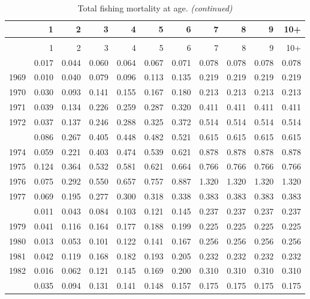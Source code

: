 \documentclass[
]{article}
\begin{document}
\begin{longtable}[t]{lrrrrrrrrrr}
\caption{\label{tab:FAA-tot-table}Total fishing mortality at age.}\\
\toprule
  & 1 & 2 & 3 & 4 & 5 & 6 & 7 & 8 & 9 & 10+\\
\midrule
\endfirsthead
\caption[]{Total fishing mortality at age. \textit{(continued)}}\\
\toprule
  & 1 & 2 & 3 & 4 & 5 & 6 & 7 & 8 & 9 & 10+\\
\midrule
\endhead

\endfoot
\bottomrule
\endlastfoot
1968 & 0.017 & 0.044 & 0.060 & 0.064 & 0.067 & 0.071 & 0.078 & 0.078 & 0.078 & 0.078\\
1969 & 0.010 & 0.040 & 0.079 & 0.096 & 0.113 & 0.135 & 0.219 & 0.219 & 0.219 & 0.219\\
1970 & 0.030 & 0.093 & 0.141 & 0.155 & 0.167 & 0.180 & 0.213 & 0.213 & 0.213 & 0.213\\
1971 & 0.039 & 0.134 & 0.226 & 0.259 & 0.287 & 0.320 & 0.411 & 0.411 & 0.411 & 0.411\\
1972 & 0.037 & 0.137 & 0.246 & 0.288 & 0.325 & 0.372 & 0.514 & 0.514 & 0.514 & 0.514\\
\addlinespace
1973 & 0.086 & 0.267 & 0.405 & 0.448 & 0.482 & 0.521 & 0.615 & 0.615 & 0.615 & 0.615\\
1974 & 0.059 & 0.221 & 0.403 & 0.474 & 0.539 & 0.621 & 0.878 & 0.878 & 0.878 & 0.878\\
1975 & 0.124 & 0.364 & 0.532 & 0.581 & 0.621 & 0.664 & 0.766 & 0.766 & 0.766 & 0.766\\
1976 & 0.075 & 0.292 & 0.550 & 0.657 & 0.757 & 0.887 & 1.320 & 1.320 & 1.320 & 1.320\\
1977 & 0.069 & 0.195 & 0.277 & 0.300 & 0.318 & 0.338 & 0.383 & 0.383 & 0.383 & 0.383\\
\addlinespace
1978 & 0.011 & 0.043 & 0.084 & 0.103 & 0.121 & 0.145 & 0.237 & 0.237 & 0.237 & 0.237\\
1979 & 0.041 & 0.116 & 0.164 & 0.177 & 0.188 & 0.199 & 0.225 & 0.225 & 0.225 & 0.225\\
1980 & 0.013 & 0.053 & 0.101 & 0.122 & 0.141 & 0.167 & 0.256 & 0.256 & 0.256 & 0.256\\
1981 & 0.042 & 0.119 & 0.168 & 0.182 & 0.193 & 0.205 & 0.232 & 0.232 & 0.232 & 0.232\\
1982 & 0.016 & 0.062 & 0.121 & 0.145 & 0.169 & 0.200 & 0.310 & 0.310 & 0.310 & 0.310\\
\addlinespace
1983 & 0.035 & 0.094 & 0.131 & 0.141 & 0.148 & 0.157 & 0.175 & 0.175 & 0.175 & 0.175\\

\end{longtable}
\end{document}
